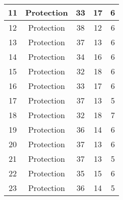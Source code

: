 \documentclass[results.tex]{subfiles}
\begin{document}
\begin{center}
\begin{tabular}{| c || c | c | c | c |}
            \hline
            11                      & Protection                   & 33                     & 17                      & 6                    \\
            \hline
            12                      & Protection                   & 38                     & 12                      & 6                    \\
            \hline
            13                      & Protection                   & 37                     & 13                      & 6                    \\
            \hline
            14                      & Protection                   & 34                     & 16                      & 6                    \\
            \hline
            15                      & Protection                   & 32                     & 18                      & 6                    \\
            \hline
            16                      & Protection                   & 33                     & 17                      & 6                    \\
            \hline
            17                      & Protection                   & 37                     & 13                      & 5                    \\
            \hline
            18                      & Protection                   & 32                     & 18                      & 7                    \\
            \hline
            19                      & Protection                   & 36                     & 14                      & 6                    \\
            \hline
            20                      & Protection                   & 37                     & 13                      & 6                    \\
            \hline
            21                      & Protection                   & 37                     & 13                      & 5                    \\
            \hline
            22                      & Protection                   & 35                     & 15                      & 6                    \\
            \hline
            23                      & Protection                   & 36                     & 14                      & 5                    \\

\end{tabular}
\end{center}
\end{document}
